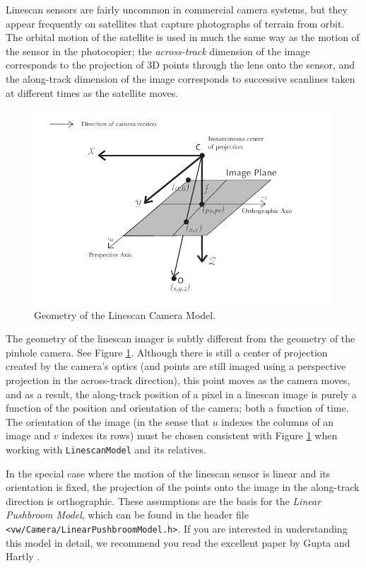 Linescan sensors are fairly uncommon in commercial camera systems, but
they appear frequently on satellites that capture photographs of
terrain from orbit.  The orbital motion of the satellite is used in
much the same way as the motion of the sensor in the photocopier; the
{\em across-track} dimension of the image corresponds to the
projection of 3D points through the lens onto the sensor, and the
along-track dimension of the image corresponds to successive scanlines
taken at different times as the satellite moves.

\begin{figure}[tbp]
\begin{center}
  \includegraphics[width=6in]{images/linescan_geometry.pdf}
 \end{center}
  \caption{Geometry of the Linescan Camera Model.}
  \label{fig:linescan-geometry}
\end{figure}

The geometry of the linescan imager is subtly different from the
geometry of the pinhole camera.  See Figure
\ref{fig:linescan-geometry}.  Although there is still a center of
projection created by the camera's optics (and points are still imaged
using a perspective projection in the across-track direction), this
point moves as the camera moves, and as a result, the along-track
position of a pixel in a linescan image is purely a function of the
position and orientation of the camera; both a function of time.  The
orientation of the image (in the sense that $u$ indexes the columns of
an image and $v$ indexes its rows) must be chosen consistent with
Figure \ref{fig:linescan-geometry} when working with
\verb#LinescanModel# and its relatives.

In the special case where the motion of the linescan sensor is linear
and its orientation is fixed, the projection of the points onto the
image in the along-track direction is orthographic.  These assumptions
are the basis for the {\em Linear Pushbroom Model}, which can be found
in the header file \verb#<vw/Camera/LinearPushbroomModel.h>#.  If you
are interested in understanding this model in detail, we recommend you
read the excellent paper by Gupta and Hartly \cite{gupta97}.

